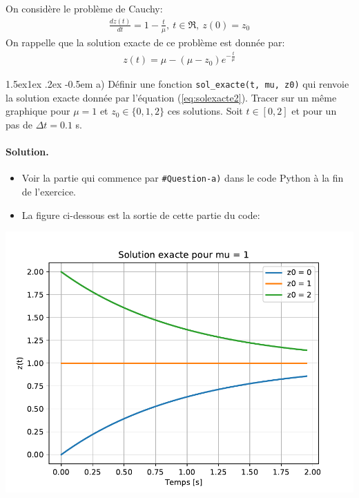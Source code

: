 \documentclass[%
oneside,                 %
final,                   %
10pt,french]{article}
\makeatletter
\newenvironment{doconceexercise}{}{}
\newcounter{doconceexercisecounter}
\newcommand\subex{\@startsection{paragraph}{4}{\z@}%
                  {1.5ex\@plus1ex \@minus.2ex}%
                  {-0.5em}%
                  {\normalfont\normalsize\bfseries}}
\makeatother
\begin{document}
\begin{doconceexercise}



On considère le problème de Cauchy:
\begin{align}
\label{eq:equdiffEx2}
\frac{d z(t)}{dt} = 1 - \frac{t}{\mu}, \ t \in \Re, \ z(0) = z_0
\end{align}
On rappelle que la solution exacte de ce problème est donnée par:
\begin{align}
\label{eq:solexacte2}
z(t) = \mu -(\mu - z_0) e^{-\frac{t}{\mu}}
\end{align}


\subex{a)}
Définir une fonction \Verb!sol_exacte(t, mu, z0)! qui renvoie la solution exacte donnée par l'équation (\ref{eq:solexacte2}). Tracer sur un même graphique pour $\mu= 1$ et $z_0 \in \{0, 1, 2\}$ ces solutions. Soit $t \in [0,2]$ et pour un pas de $\Delta t = 0.1$ s.


\paragraph{Solution.}
\begin{itemize}
\item Voir la partie qui commence par \Verb!#Question-a)! dans le code Python à la fin de l'exercice.

\item La figure ci-dessous est la sortie de cette partie du code:
\end{itemize}

\noindent
\vspace{6mm}

\centerline{\includegraphics[width=0.7\linewidth]{scripts/Ex2_solexactemu1.pdf}}


\end{doconceexercise}
\end{document}
